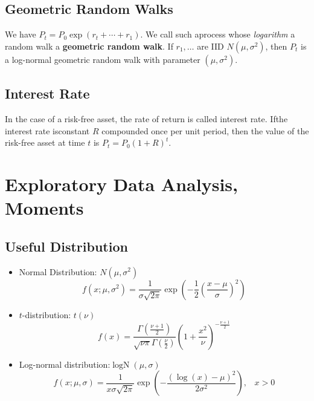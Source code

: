\documentclass[12pt]{article}
\theoremstyle{definition}
\DeclareMathOperator{\LogN}{logN}
\begin{document}
\subsection{Geometric Random Walks}
We have $P_t=P_0\exp(r_t+\cdots +r_1)$. We call such aprocess whose \textit{logarithm} a random walk a \textbf{geometric random walk}. If $r_1,\ldots$ are IID $N(\mu,\sigma^2)$, then $P_t$ is a log-normal geometric random walk with parameter $(\mu, \sigma^2)$.
\subsection{Interest Rate}
In the case of a risk-free asset, the rate of return is called interest rate. Ifthe interest rate isconstant $R$ compounded once per unit period, then the value of the risk-free asset at time $t$ is $P_t=P_0(1+R)^t$.

\clearpage
\section{Exploratory Data Analysis, Moments}
\subsection{Useful Distribution}
\begin{itemize}
  \item Normal Distribution: $N(\mu, \sigma^2)$
  \[
f(x;\mu,\sigma^2) = \frac{1}{\sigma\sqrt{2\pi}}\exp(-\frac{1}{2}(\frac{x-\mu}{\sigma})^2)
  \]
  \item $t$-distribution: $t(\nu)$
  \[
f(x)=\frac{\Gamma(\frac{\nu + 1}{2})}{\sqrt{\nu\pi}\Gamma(\frac{\nu}{2})}(1+\frac{x^2}{\nu})^{-\frac{\nu+1}{2}}
  \]
  \item Log-normal distribution:$\LogN(\mu,\sigma)$
  \[
f(x;\mu,\sigma) =\frac{1}{x\sigma\sqrt{2\pi}}\exp(-\frac{(\log(x)-\mu)^2}{2\sigma^2}),\;\;\;x>0
  \]
\end{itemize}
\end{document}

